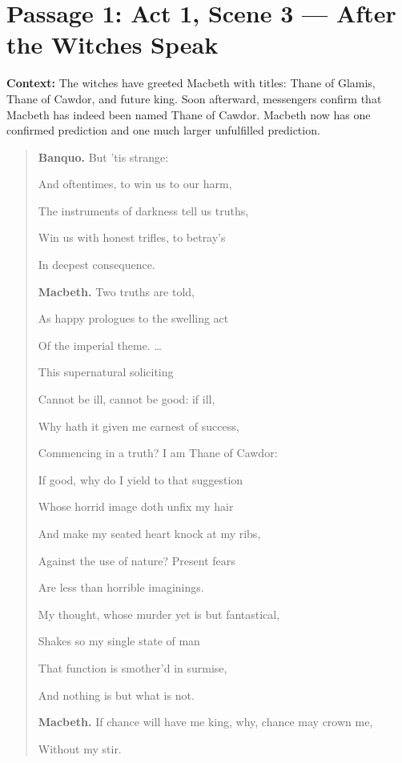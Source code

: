 \documentclass[12pt]{article}
\newenvironment{playpassage}{\begin{quote}\small\setlength{\parskip}{0.25em}}{\end{quote}}
\newcommand{\speaker}[1]{\textbf{#1.}}
\begin{document}
\section*{Passage 1: Act 1, Scene 3 — After the Witches Speak}

\textbf{Context:} The witches have greeted Macbeth with titles: Thane of Glamis, Thane of Cawdor, and future king. Soon afterward, messengers confirm that Macbeth has indeed been named Thane of Cawdor. Macbeth now has one confirmed prediction and one much larger unfulfilled prediction.

\begin{playpassage}
\speaker{Banquo} But 'tis strange:\par
And oftentimes, to win us to our harm,\par
The instruments of darkness tell us truths,\par
Win us with honest trifles, to betray's\par
In deepest consequence.

\speaker{Macbeth} Two truths are told,\par
As happy prologues to the swelling act\par
Of the imperial theme. \ldots\par
This supernatural soliciting\par
Cannot be ill, cannot be good: if ill,\par
Why hath it given me earnest of success,\par
Commencing in a truth? I am Thane of Cawdor:\par
If good, why do I yield to that suggestion\par
Whose horrid image doth unfix my hair\par
And make my seated heart knock at my ribs,\par
Against the use of nature? Present fears\par
Are less than horrible imaginings.\par
My thought, whose murder yet is but fantastical,\par
Shakes so my single state of man\par
That function is smother'd in surmise,\par
And nothing is but what is not.

\speaker{Macbeth} If chance will have me king, why, chance may crown me,\par
Without my stir.
\end{playpassage}
\end{document}
